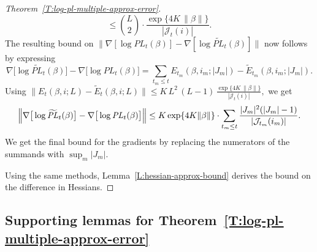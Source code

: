 \documentclass[final]{statsoc}
\begin{document}
\begin{proof}[Theorem~\ref{T:log-pl-multiple-approx-error}]
\[        \leq
        \binom{L}{2}
        \cdot
        \frac{\exp\{4 K \, \| \beta \|\}}{| \mathcal{J}_t(i) |}.
\]
The resulting bound on
\(
    \|
    \nabla [\log \mathit{PL}_{t}(\beta) ]
    -
    \nabla [\log \widetilde{\mathit{PL}}_{t}(\beta) ]
    \|
\)
now follows by expressing
\[
    \nabla \big[ \log \widetilde{\mathit{PL}}_t(\beta) \big]
    -
    \nabla \big[ \log \mathit{PL}_t(\beta )\big]
        =
        \sum_{t_m \leq t}
            E_{t_m}\!(\beta, i_m; |J_m|)
            -
            \widetilde{E}_{t_m}\!(\beta, i_m; |J_m|).
\]
Using
\(
    \big\| E_{t}(\beta, i; L) - \widetilde{E}_t(\beta, i; L) \big\|
        \leq
        K \, L^2 \, (L - 1)
        \,
        \frac{\exp\{4 K \, \| \beta \|\}}{| \mathcal{J}_t(i) |},
\)
we get
\[
    \Big\|
        \nabla\big[ \log \widetilde{\mathit{PL}}_t( \beta ) \big]
        -
        \nabla\big[ \log {\mathit{PL}}_t( \beta ) \big]
    \Big\| \\
        \leq
            K
            \exp\{4 K \| \beta \|\}
            \cdot
            \sum_{t_m \leq t}
                \frac{|J_m|^2(|J_m| - 1)}{|\mathcal{J}_{t_m}(i_m)|}.
\]
We get the final bound for the gradients by replacing the numerators of the
summands with $\sup_m |J_m|$.

Using the same methods, Lemma~\ref{L:hessian-approx-bound} derives the bound
on the difference in Hessians.
\end{proof}

\subsection{Supporting lemmas for Theorem~\ref{T:log-pl-multiple-approx-error}}
\end{document}
